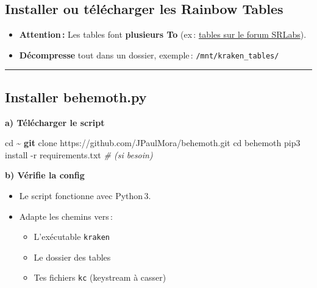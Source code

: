 \documentclass[
  french,
]{article}
\newenvironment{Shaded}{\begin{snugshade}}{\end{snugshade}}
\newcommand{\AttributeTok}[1]{\textcolor[rgb]{0.13,0.29,0.53}{#1}}
\newcommand{\BuiltInTok}[1]{#1}
\newcommand{\CommentTok}[1]{\textcolor[rgb]{0.56,0.35,0.01}{\textit{#1}}}
\newcommand{\ExtensionTok}[1]{#1}
\newcommand{\FunctionTok}[1]{\textcolor[rgb]{0.13,0.29,0.53}{\textbf{#1}}}
\newcommand{\NormalTok}[1]{#1}
\providecommand{\tightlist}{%
  \setlength{\itemsep}{0pt}\setlength{\parskip}{0pt}}
\begin{document}
\subsection{Installer ou télécharger les Rainbow
Tables}\label{installer-ou-tuxe9luxe9charger-les-rainbow-tables}

\begin{itemize}
\tightlist
\item
  \textbf{Attention\,:} Les tables font \textbf{plusieurs To} (ex\,:
  \href{https://opensource.srlabs.de/projects/a51-decrypt/wiki/Rainbow_Tables}{tables
  sur le forum SRLabs}).
\item
  \textbf{Décompresse} tout dans un dossier, exemple\,:
  \texttt{/mnt/kraken\_tables/}
\end{itemize}

\begin{center}\rule{0.5\linewidth}{0.5pt}\end{center}

\subsection{Installer behemoth.py}\label{installer-behemoth.py}

\textbf{a) Télécharger le script}

\begin{Shaded}
\begin{Highlighting}[]
\BuiltInTok{cd}\NormalTok{ \textasciitilde{}}
\FunctionTok{git}\NormalTok{ clone https://github.com/JPaulMora/behemoth.git}
\BuiltInTok{cd}\NormalTok{ behemoth}
\ExtensionTok{pip3}\NormalTok{ install }\AttributeTok{{-}r}\NormalTok{ requirements.txt  }\CommentTok{\# (si besoin)}
\end{Highlighting}
\end{Shaded}

\textbf{b) Vérifie la config}

\begin{itemize}
\item
  Le script fonctionne avec Python\,3.
\item
  Adapte les chemins vers\,:

  \begin{itemize}
  \tightlist
  \item
    L'exécutable \texttt{kraken}
  \item
    Le dossier des tables
  \item
    Tes fichiers \texttt{kc} (keystream à casser)
  \end{itemize}
\end{itemize}
\end{document}
